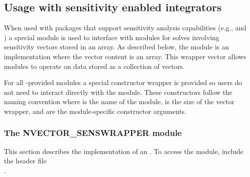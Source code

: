 \subsection{Usage with sensitivity enabled integrators}
\label{ss:sunnonlinsol_sens}

When used with {\sundials} packages that support sensitivity analysis
capabilities (e.g., {\cvodes} and {\idas}) a special {\nvector} module is used
to interface with {\sunnonlinsol} modules for solves involving sensitivity
vectors stored in an {\nvector} array. As described below, the {\nvecwrap}
module is an {\nvector} implementation where the vector content is an {\nvector}
array. This wrapper vector allows {\sunnonlinsol} modules to operate on data
stored as a collection of vectors.

For all {\sundials}-provided {\sunnonlinsol} modules a special constructor
wrapper is provided so users do not need to interact directly with the
{\nvecwrap} module. These constructors follow the naming
convention  where \id{***} is the name of
the {\sunnonlinsol} module,  is the size of the vector wrapper,
and  are the module-specific constructor arguments. 

\subsubsection*{The NVECTOR\_SENSWRAPPER module}
\label{ss:sunnonlinsol_senswrapper}

This section describes the {\nvecwrap} implementation of an {\nvector}. To
access the {\nvecwrap} module, include the header file \\ \noindent
{}.

